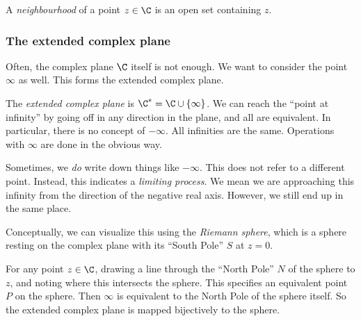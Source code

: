 \documentclass[a4paper]{article}
\begin{document}
\begin{defi}[Neighbourhood]
  A \emph{neighbourhood} of a point $z \in \C$ is an open set containing $z$.
\end{defi}

\subsubsection*{The extended complex plane}
Often, the complex plane $\C$ itself is not enough. We want to consider the point $\infty$ as well. This forms the extended complex plane.
\begin{defi}
  The \emph{extended complex plane} is $\C^* = \C \cup \{\infty\}$. We can reach the ``point at infinity'' by going off in any direction in the plane, and all are equivalent. In particular, there is no concept of $-\infty$. All infinities are the same. Operations with $\infty$ are done in the obvious way.
\end{defi}
Sometimes, we \emph{do} write down things like $-\infty$. This does not refer to a different point. Instead, this indicates a \emph{limiting process}. We mean we are approaching this infinity from the direction of the negative real axis. However, we still end up in the same place.

Conceptually, we can visualize this using the \emph{Riemann sphere}, which is a sphere resting on the complex plane with its ``South Pole'' $S$ at $z = 0$.
\begin{center}
\end{center}
For any point $z \in \C$, drawing a line through the ``North Pole'' $N$ of the sphere to $z$, and noting where this intersects the sphere. This specifies an equivalent point $P$ on the sphere. Then $\infty$ is equivalent to the North Pole of the sphere itself. So the extended complex plane is mapped bijectively to the sphere.
\end{document}
